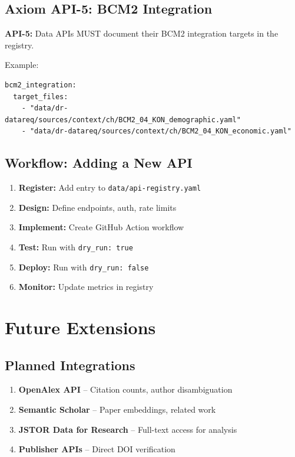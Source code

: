 \subsection{Axiom API-5: BCM2 Integration}

\begin{tcolorbox}[colback=blue!5, colframe=blue!50]
\textbf{API-5:} Data APIs MUST document their BCM2 integration targets in the registry.
\end{tcolorbox}

Example:
\begin{verbatim}
bcm2_integration:
  target_files:
    - "data/dr-datareq/sources/context/ch/BCM2_04_KON_demographic.yaml"
    - "data/dr-datareq/sources/context/ch/BCM2_04_KON_economic.yaml"
\end{verbatim}

\subsection{Workflow: Adding a New API}

\begin{enumerate}
    \item \textbf{Register:} Add entry to \texttt{data/api-registry.yaml}
    \item \textbf{Design:} Define endpoints, auth, rate limits
    \item \textbf{Implement:} Create GitHub Action workflow
    \item \textbf{Test:} Run with \texttt{dry\_run: true}
    \item \textbf{Deploy:} Run with \texttt{dry\_run: false}
    \item \textbf{Monitor:} Update metrics in registry
\end{enumerate}

\section{Future Extensions}
\label{sec:api-future}

\subsection{Planned Integrations}

\begin{enumerate}
    \item \textbf{OpenAlex API} -- Citation counts, author disambiguation
    \item \textbf{Semantic Scholar} -- Paper embeddings, related work
    \item \textbf{JSTOR Data for Research} -- Full-text access for analysis
    \item \textbf{Publisher APIs} -- Direct DOI verification
\end{enumerate}

